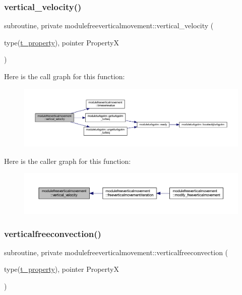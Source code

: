 \subsubsection{\texorpdfstring{vertical\+\_\+velocity()}{vertical\_velocity()}}
{\footnotesize\ttfamily subroutine, private modulefreeverticalmovement\+::vertical\+\_\+velocity (\begin{DoxyParamCaption}\item[{type(\mbox{\hyperlink{structmodulefreeverticalmovement_1_1t__property}{t\+\_\+property}}), pointer}]{PropertyX }\end{DoxyParamCaption})\hspace{0.3cm}{\ttfamily [private]}}

Here is the call graph for this function\+:\nopagebreak
\begin{figure}[H]
\begin{center}
\leavevmode
\includegraphics[width=350pt]{namespacemodulefreeverticalmovement_ab6e298fcea3ea467957f90a97c8032df_cgraph}
\end{center}
\end{figure}
Here is the caller graph for this function\+:\nopagebreak
\begin{figure}[H]
\begin{center}
\leavevmode
\includegraphics[width=350pt]{namespacemodulefreeverticalmovement_ab6e298fcea3ea467957f90a97c8032df_icgraph}
\end{center}
\end{figure}
\mbox{\label{namespacemodulefreeverticalmovement_a31ae6c338b4621e00f2dd8c66bb9268f}} 
\subsubsection{\texorpdfstring{verticalfreeconvection()}{verticalfreeconvection()}}
{\footnotesize\ttfamily subroutine, private modulefreeverticalmovement\+::verticalfreeconvection (\begin{DoxyParamCaption}\item[{type(\mbox{\hyperlink{structmodulefreeverticalmovement_1_1t__property}{t\+\_\+property}}), pointer}]{PropertyX }\end{DoxyParamCaption})\hspace{0.3cm}{\ttfamily [private]}}

